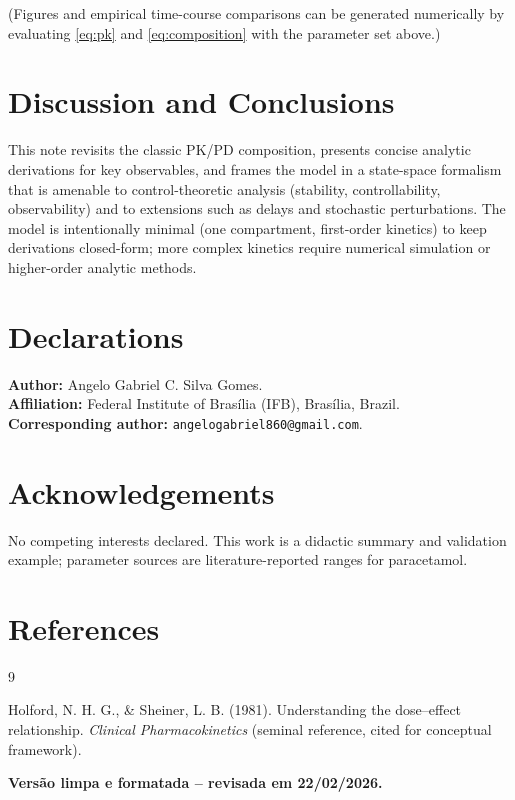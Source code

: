 \documentclass[10pt,a4paper]{article}
\begin{document}
(Figures and empirical time-course comparisons can be generated numerically by evaluating \eqref{eq:pk} and \eqref{eq:composition} with the parameter set above.)

\section{Discussion and Conclusions}

This note revisits the classic PK/PD composition, presents concise analytic derivations for key observables, and frames the model in a state-space formalism that is amenable to control-theoretic analysis (stability, controllability, observability) and to extensions such as delays and stochastic perturbations. The model is intentionally minimal (one compartment, first-order kinetics) to keep derivations closed-form; more complex kinetics require numerical simulation or higher-order analytic methods.

\section*{Declarations}

\noindent \textbf{Author:} Angelo Gabriel C. Silva Gomes.\\
\noindent \textbf{Affiliation:} Federal Institute of Brasília (IFB), Brasília, Brazil.\\
\noindent \textbf{Corresponding author:} \texttt{angelogabriel860@gmail.com}.

\section*{Acknowledgements}

No competing interests declared. This work is a didactic summary and validation example; parameter sources are literature-reported ranges for paracetamol.

\section*{References}

\begin{thebibliography}{9}

Holford, N. H. G., \& Sheiner, L. B. (1981). 
Understanding the dose--effect relationship. 
\emph{Clinical Pharmacokinetics} (seminal reference, cited for conceptual framework).

\end{thebibliography}

\vspace{2em}

\noindent \textbf{Versão limpa e formatada -- revisada em 22/02/2026.}
\end{document}
